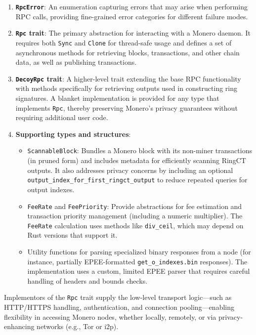 \documentclass[12pt,a4paper]{article}
\begin{document}
\begin{enumerate}
    \item \textbf{\texttt{RpcError}}: An enumeration capturing errors that may arise when performing
    RPC calls, providing fine-grained error categories for different failure modes.

    \item \textbf{\texttt{Rpc} trait}: The primary abstraction for interacting with a Monero daemon.
    It requires both \texttt{Sync} and \texttt{Clone} for thread-safe usage and defines a set of
    asynchronous methods for retrieving blocks, transactions, and other chain data, as well as
    publishing transactions.

    \item \textbf{\texttt{DecoyRpc} trait}: A higher-level trait extending the base RPC
    functionality with methods specifically for retrieving outputs used in constructing ring
    signatures. A blanket implementation is provided for any type that implements \texttt{Rpc},
    thereby preserving Monero’s privacy guarantees without requiring additional user code.

    \item \textbf{Supporting types and structures}:
    \begin{itemize}
      \item \texttt{ScannableBlock}: Bundles a Monero block with its non-miner transactions (in
      pruned form) and includes metadata for efficiently scanning RingCT outputs. It also addresses
      privacy concerns by including an optional \texttt{output\_index\_for\_first\_ringct\_output}
      to reduce repeated queries for output indexes.
      \item \texttt{FeeRate} and \texttt{FeePriority}: Provide abstractions for fee estimation and
      transaction priority management (including a numeric multiplier). The \texttt{FeeRate}
      calculation uses methods like \texttt{div\_ceil}, which may depend on Rust versions that
      support it.
      \item Utility functions for parsing specialized binary responses from a node (for instance,
      partially EPEE-formatted \texttt{get\_o\_indexes.bin} responses). The implementation uses a
      custom, limited EPEE parser that requires careful handling of headers and bounds checks.
    \end{itemize}
\end{enumerate}

Implementors of the \texttt{Rpc} trait supply the low-level transport logic—such as HTTP/HTTPS
handling, authentication, and connection pooling—enabling flexibility in accessing Monero nodes,
whether locally, remotely, or via privacy-enhancing networks (e.g., Tor or i2p).
\end{document}
